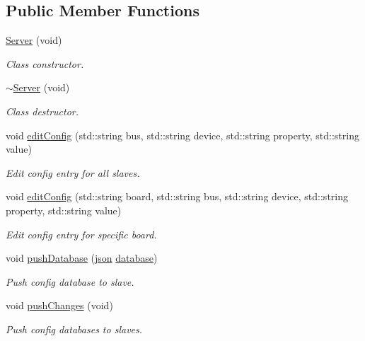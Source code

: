\subsection*{Public Member Functions}
\begin{DoxyCompactItemize}
\item 
\hyperlink{class_server_ae8df2df494913617b098be2ed7261d3d}{Server} (void)
\begin{DoxyCompactList}\small\item\em Class constructor. \end{DoxyCompactList}\item 
\hyperlink{class_server_a803b89b673283131d2ae765c82923f8d}{$\sim$\+Server} (void)
\begin{DoxyCompactList}\small\item\em Class destructor. \end{DoxyCompactList}\item 
void \hyperlink{class_server_af8c102697196f181155b760124f47802}{edit\+Config} (std\+::string bus, std\+::string device, std\+::string property, std\+::string value)
\begin{DoxyCompactList}\small\item\em Edit config entry for all slaves. \end{DoxyCompactList}\item 
void \hyperlink{class_server_adc88ca669caaadbd384ad43fb7d27fdc}{edit\+Config} (std\+::string board, std\+::string bus, std\+::string device, std\+::string property, std\+::string value)
\begin{DoxyCompactList}\small\item\em Edit config entry for specific board. \end{DoxyCompactList}\item 
void \hyperlink{class_server_a94472e91b4ade2a006ff607b85dfe8ad}{push\+Database} (\hyperlink{_couch_d_b_8hpp_ab701e3ac61a85b337ec5c1abaad6742d}{json} \hyperlink{class_couch_d_b_a5951cb721e50d0b8d24c8fea625909ff}{database})
\begin{DoxyCompactList}\small\item\em Push config database to slave. \end{DoxyCompactList}\item 
void \hyperlink{class_server_ae1da14c02221a3646f45d1964808fdfc}{push\+Changes} (void)
\begin{DoxyCompactList}\small\item\em Push config databases to slaves. \end{DoxyCompactList}\end{DoxyCompactItemize}
